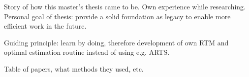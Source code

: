 \startsection[title=Author's remarks]

    Story of how this master's thesis came to be. Own experience while
    researching. Personal goal of thesis: provide a solid foundation as legacy
    to enable more efficient work in the future.

    Guiding principle: learn by doing, therefore development of own RTM and
    optimal estimation routine instead of using e.g. ARTS.

\stopsection


\startsection[title=Microwave Radiometer Retrieval Literature]

    Table of papers, what methods they used, etc.

\stopsection
